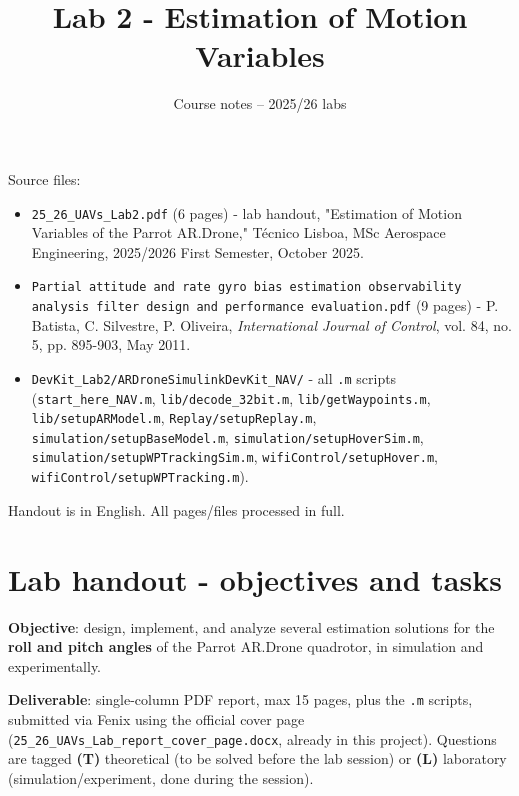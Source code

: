 \documentclass[11pt]{article}
\title{Lab 2 - Estimation of Motion Variables}
\author{Course notes -- 2025/26 labs}
\date{}
\begin{document}
\maketitle
\tableofcontents
\vspace{1em}

Source files:
\begin{itemize}
\item \texttt{25\_\allowbreak{}26\_\allowbreak{}UAVs\_\allowbreak{}Lab2.pdf} (6 pages) - lab handout, "Estimation of Motion Variables of the Parrot AR.Drone," Técnico Lisboa, MSc Aerospace Engineering, 2025/2026 First Semester, October 2025.
\item \texttt{Partial attitude and rate gyro bias estimation observability analysis filter design and performance evaluation.pdf} (9 pages) - P. Batista, C. Silvestre, P. Oliveira, \textit{International Journal of Control}, vol. 84, no. 5, pp. 895-903, May 2011.
\item \texttt{DevKit\_\allowbreak{}Lab2/\allowbreak{}ARDroneSimulinkDevKit\_\allowbreak{}NAV/} - all \texttt{.m} scripts (\texttt{start\_\allowbreak{}here\_\allowbreak{}NAV.m}, \texttt{lib/\allowbreak{}decode\_\allowbreak{}32bit.m}, \texttt{lib/\allowbreak{}getWaypoints.m}, \texttt{lib/\allowbreak{}setupARModel.m}, \texttt{Replay/\allowbreak{}setupReplay.m}, \texttt{simulation/\allowbreak{}setupBaseModel.m}, \texttt{simulation/\allowbreak{}setupHoverSim.m}, \texttt{simulation/\allowbreak{}setupWPTrackingSim.m}, \texttt{wifiControl/\allowbreak{}setupHover.m}, \texttt{wifiControl/\allowbreak{}setupWPTracking.m}).
\end{itemize}

Handout is in English. All pages/files processed in full.

\section{Lab handout - objectives and tasks}

\textbf{Objective}: design, implement, and analyze several estimation solutions for the \textbf{roll and pitch angles} of the Parrot AR.Drone quadrotor, in simulation and experimentally.

\textbf{Deliverable}: single-column PDF report, max 15 pages, plus the \texttt{.m} scripts, submitted via Fenix using the official cover page (\texttt{25\_\allowbreak{}26\_\allowbreak{}UAVs\_\allowbreak{}Lab\_\allowbreak{}report\_\allowbreak{}cover\_\allowbreak{}page.docx}, already in this project). Questions are tagged \textbf{(T)} theoretical (to be solved before the lab session) or \textbf{(L)} laboratory (simulation/experiment, done during the session).
\end{document}
